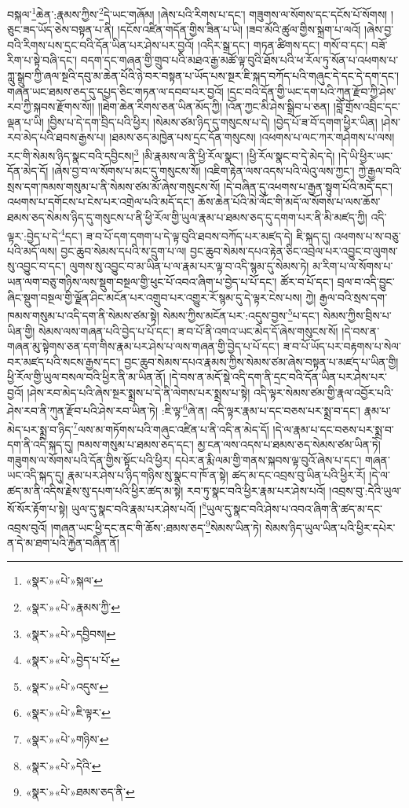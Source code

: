 བསྐལ་\footnote{«སྣར་»«པེ་»སྐལ་}ཆེན་:རྣམས་ཀྱིས་\footnote{«སྣར་»«པེ་»རྣམས་ཀྱི་}དེ་ཡང་གཞོམ། །ཞེས་པའི་རིགས་པ་དང་། གཟུགས་ལ་སོགས་དང་དངོས་པོ་སོགས། །ཅུང་ཟད་ཡོད་ཅེས་བསྟན་པ་ནི། །དངོས་འཛིན་གདོན་གྱིས་ཟིན་པ་ཡི། །ཟབ་མོའི་ཚུལ་གྱིས་སྐྲག་པ་ལའོ། །ཞེས་བྱ་བའི་རིགས་པས་དྲང་བའི་དོན་ཡིན་པར་ཤེས་པར་བྱའོ། །འདིར་སྒྲ་དང་། གཏན་ཚིགས་དང་། གསོ་བ་དང་། བཟོ་རིག་པ་སྟེ་བཞི་དང་། བདག་དང་གཞན་གྱི་གྲུབ་པའི་མཐའ་རྒྱ་མཚོ་ལྟ་བུའི་ཐོས་པའི་ཕ་རོལ་ཏུ་སོན་པ་འཕགས་པ་ཀླུ་སྒྲུབ་ཀྱི་ཞལ་སྔའི་དབུ་མ་ཆེན་པོའི་ཉེ་བར་བསྟན་པ་ཡོད་པས་སྔར་ཇི་སྐད་བཀོད་པའི་གཞུང་དེ་དང་དེ་དག་དང་། གཞན་ཡང་ཐམས་ཅད་དུ་དཔྱད་ཅིང་གཏན་ལ་དབབ་པར་བྱའོ། །དྲང་བའི་དོན་གྱི་ཡང་དག་པའི་ཀུན་རྫོབ་ཀྱི་ཤེས་རབ་ཀྱི་སྐབས་རྫོགས་སོ།། །།ཐེག་ཆེན་རིགས་ཅན་ཡིན་མོད་ཀྱི། །འོན་ཀྱང་མི་ཤེས་སྒྲིབ་པ་ཅན། །བློ་གྲོས་འབྲིང་དང་ལྡན་པ་ཡི། །བྱིས་པ་དེ་དག་བྲིད་པའི་ཕྱིར། །སེམས་ཙམ་ཉིད་དུ་གསུངས་པ་དེ། །བྱེད་པོ་ཟ་བོ་དགག་ཕྱིར་ཡིན། །ཤེས་རབ་མེད་པའི་ཐབས་རྒྱས་པ། །ཐམས་ཅད་མཁྱེན་པས་དྲང་དོན་གསུངས། །འཕགས་པ་ལང་ཀར་གཤེགས་པ་ལས། རང་གི་སེམས་ཉིད་སྣང་བའི་དབྱིངས།\footnote{«སྣར་»«པེ་»དབྱིབས།} །མི་རྣམས་ལ་ནི་ཕྱི་རོལ་སྣང་། །ཕྱི་རོལ་སྣང་བ་དེ་མེད་དེ། །དེ་ཡི་ཕྱིར་ཡང་དོན་མེད་དོ། །ཞེས་བྱ་བ་ལ་སོགས་པ་མང་དུ་གསུངས་སོ། །འཇིག་རྟེན་ལས་འདས་པའི་ལེའུ་ལས་ཀྱང་། ཀྱེ་རྒྱལ་བའི་སྲས་དག་ཁམས་གསུམ་པ་ནི་སེམས་ཙམ་མོ་ཞེས་གསུངས་སོ། །དེ་བཞིན་དུ་འཕགས་པ་རྒྱན་སྟུག་པོའི་མདོ་དང་། འཕགས་པ་དགོངས་པ་ངེས་པར་འགྲེལ་པའི་མདོ་དང་། ཆོས་ཆེན་པོའི་མེ་ལོང་གི་མདོ་ལ་སོགས་པ་ལས་ཆོས་ཐམས་ཅད་སེམས་ཉིད་དུ་གསུངས་པ་ནི་ཕྱི་རོལ་གྱི་ཡུལ་རྣམ་པ་ཐམས་ཅད་དུ་དགག་པར་ནི་མི་མཛད་ཀྱི། འདི་ལྟར་:བྱེད་པ་དེ་\footnote{«སྣར་»«པེ་»བྱེད་པ་པོ་}དང་། ཟ་བ་པོ་དག་དགག་པ་དེ་ལྟ་བུའི་ཐབས་བཀོད་པར་མཛད་དེ། ཇི་སྐད་དུ། འཕགས་པ་ས་བཅུ་པའི་མདོ་ལས། བྱང་ཆུབ་སེམས་དཔའི་ས་དྲུག་པ་ལ། བྱང་ཆུབ་སེམས་དཔའ་རྟེན་ཅིང་འབྲེལ་པར་འབྱུང་བ་ལུགས་སུ་འབྱུང་བ་དང་། ལུགས་སུ་འབྱུང་བ་མ་ཡིན་པ་ལ་རྣམ་པར་ལྟ་བ་འདི་སྙམ་དུ་སེམས་ཏེ། མ་རིག་པ་ལ་སོགས་པ་ཡན་ལག་བཅུ་གཉིས་ལས་སྡུག་བསྔལ་གྱི་ཕུང་པོ་འབའ་ཞིག་པ་བྱེད་པ་པོ་དང་། ཚོར་བ་པོ་དང་། བྲལ་བ་འདི་བྱུང་ཞིང་སྡུག་བསྔལ་གྱི་ལྗོན་ཤིང་མངོན་པར་འགྲུབ་པར་འགྱུར་རོ་སྙམ་དུ་དེ་ལྟར་ངེས་པས། ཀྱེ། རྒྱལ་བའི་སྲས་དག་ཁམས་གསུམ་པ་འདི་དག་ནི་སེམས་ཙམ་སྟེ། སེམས་ཀྱིས་མངོན་པར་:འདུས་བྱས་\footnote{«སྣར་»«པེ་»འདུས་}པ་དང་། སེམས་ཀྱིས་བྲིས་པ་ཡིན་གྱི། སེམས་ལས་གཞན་པའི་བྱེད་པ་པོ་དང་། ཟ་བ་པོ་ནི་འགའ་ཡང་མེད་དོ་ཞེས་གསུངས་སོ། །དེ་བས་ན་གཞན་མུ་སྟེགས་ཅན་དག་གིས་རྣམ་པར་ཤེས་པ་ལས་གཞན་གྱི་བྱེད་པ་པོ་དང་། ཟ་བ་པོ་ཡོད་པར་བརྟགས་པ་སེལ་བར་མཛད་པའི་སངས་རྒྱས་དང་། བྱང་ཆུབ་སེམས་དཔའ་རྣམས་ཀྱིས་སེམས་ཙམ་ཞེས་བསྟན་པ་མཛད་པ་ཡིན་གྱི། ཕྱི་རོལ་གྱི་ཡུལ་བསལ་བའི་ཕྱིར་ནི་མ་ཡིན་ནོ། །དེ་བས་ན་མདོ་སྡེ་འདི་དག་ནི་དྲང་བའི་དོན་ཡིན་པར་ཤེས་པར་བྱའོ། །ཤེས་རབ་མེད་པའི་ཞེས་སྔར་སྨྲས་པ་དེ་ནི་ལེགས་པར་སྨྲས་པ་སྟེ། འདི་ལྟར་སེམས་ཙམ་གྱི་རྣལ་འབྱོར་པའི་ཤེས་རབ་ནི་ཀུན་རྫོབ་པའི་ཤེས་རབ་ཡིན་ཏེ། :ཇི་ལྟ་\footnote{«སྣར་»«པེ་»ཇི་ལྟར་}ཞེ་ན། འདི་ལྟར་རྣམ་པ་དང་བཅས་པར་སྨྲ་བ་དང་། རྣམ་པ་མེད་པར་སྨྲ་བ་ཉིད་\footnote{«སྣར་»«པེ་»གཉིས་}ལས་མ་གཏོགས་པའི་གཞུང་འཛིན་པ་ནི་འདི་ན་མེད་དོ། །དེ་ལ་རྣམ་པ་དང་བཅས་པར་སྨྲ་བ་དག་ནི་འདི་སྐད་དུ། ཁམས་གསུམ་པ་ཐམས་ཅད་དང་། མྱ་ངན་ལས་འདས་པ་ཐམས་ཅད་སེམས་ཙམ་ཡིན་ཏེ། གཟུགས་ལ་སོགས་པའི་དོན་གྱིས་སྟོང་པའི་ཕྱིར། དཔེར་ན་རྨི་ལམ་གྱི་གནས་སྐབས་ལྟ་བུའོ་ཞེས་པ་དང་། གཞན་ཡང་འདི་སྐད་དུ། རྣམ་པར་ཤེས་པ་ཉིད་གཉིས་སུ་སྣང་བ་ཁོ་ན་སྟེ། ཚད་མ་དང་འབྲས་བུ་ཡིན་པའི་ཕྱིར་རོ། །དེ་ལ་ཚད་མ་ནི་འདིས་རྗེས་སུ་དཔག་པའི་ཕྱིར་ཚད་མ་སྟེ། རབ་ཏུ་སྣང་བའི་ཕྱིར་རྣམ་པར་ཤེས་པའོ། །འབྲས་བུ་:དེའི་ཡུལ་སོ་སོར་རྟོག་པ་སྟེ། ཡུལ་དུ་སྣང་བའི་རྣམ་པར་ཤེས་པའོ། །\footnote{«སྣར་»«པེ་»དེའི་}ཡུལ་དུ་སྣང་བའི་ཤེས་པ་འབའ་ཞིག་ནི་ཚད་མ་དང་འབྲས་བུའོ། །གཞན་ཡང་ཕྱི་དང་ནང་གི་ཆོས་:ཐམས་ཅད་\footnote{«སྣར་»«པེ་»ཐམས་ཅད་ནི་}སེམས་ཡིན་ཏེ། སེམས་ཉིད་ཡུལ་ཡིན་པའི་ཕྱིར་དཔེར་ན་དེ་མ་ཐག་པའི་རྐྱེན་བཞིན་ནོ། 